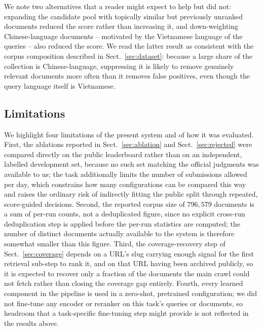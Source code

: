 \documentclass[runningheads]{llncs}
\begin{document}
We note two alternatives that a reader might expect to help but did not:
expanding the candidate pool with topically similar but previously unranked
documents reduced the score rather than increasing it, and down-weighting
Chinese-language documents -- motivated by the Vietnamese language of the
queries -- also reduced the score. We read the latter result as consistent
with the corpus composition described in Sect.~\ref{sec:dataset}: because a
large share of the collection is Chinese-language, suppressing it is likely
to remove genuinely relevant documents more often than it removes
false positives, even though the query language itself is Vietnamese.

\subsection{Limitations}
\label{sec:limitations}

We highlight four limitations of the present system and of how it was
evaluated. First, the ablations reported in Sect.~\ref{sec:ablation} and
Sect.~\ref{sec:rejected} were compared directly on the public leaderboard
rather than on an independent, labelled development set, because no such set
matching the official judgments was available to us; the task additionally
limits the number of submissions allowed per day, which constrains how many
configurations can be compared this way and raises the ordinary risk of
indirectly fitting the public split through repeated, score-guided
decisions. Second, the reported corpus size of $796{,}579$ documents is a
sum of per-run counts, not a deduplicated figure, since no explicit
cross-run deduplication step is applied before the per-run statistics are
computed; the number of distinct documents actually available to the system
is therefore somewhat smaller than this figure. Third, the coverage-recovery
step of Sect.~\ref{sec:coverage} depends on a URL's slug carrying enough
signal for the first retrieval sub-step to rank it, and on that URL having
been archived publicly, so it is expected to recover only a fraction of the
documents the main crawl could not fetch rather than closing the coverage
gap entirely. Fourth, every learned component in the pipeline is used in a
zero-shot, pretrained configuration; we did not fine-tune any encoder or
reranker on this task's queries or documents, so headroom that a
task-specific fine-tuning step might provide is not reflected in the results
above.
\end{document}
